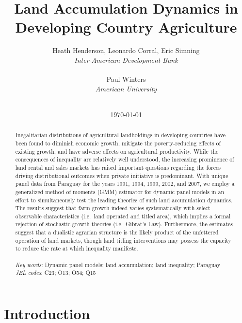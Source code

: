 \documentclass[english]{article}
\title{Land Accumulation Dynamics in Developing Country Agriculture}
\author{
Heath Henderson, Leonardo Corral, Eric Simning\\
\textit{Inter-American Development Bank} \\
\\
Paul Winters \\
\textit{American University}
\\ \\
}
\date{\today}
\begin{document}

\begin{titlepage}
\maketitle

\begin{abstract}
Inegalitarian distributions of agricultural landholdings in developing countries
have been found to diminish economic growth, mitigate the poverty-reducing
effects of existing growth, and have adverse effects on agricultural 
productivity.
While the consequences of inequality are relatively well understood, the 
increasing prominence of land rental and sales markets has raised 
important questions regarding the forces driving distributional outcomes 
when private initiative is predominant.
With unique panel data from Paraguay for the years 1991, 1994, 1999, 2002, 
and 2007, we employ a generalized method of moments (GMM) estimator 
for dynamic panel models in an effort to simultaneously test the leading 
theories of such land accumulation dynamics. 
The results suggest that farm growth indeed varies systematically with 
select observable characteristics (i.e.\ land operated and titled area), 
which implies a formal rejection of stochastic growth theories (i.e.\
Gibrat's Law). 
Furthermore, the estimates suggest that a dualistic agrarian structure is 
the likely product of the unfettered operation of land markets, though
land titling interventions may possess the capacity to reduce the rate at 
which inequality manifests. \\
\\
\textit{Key words}: Dynamic panel models; land accumulation; 
land inequality; Paraguay \\
\textit{JEL codes}:  C23; O13; O54; Q15
\end{abstract}
\thispagestyle{empty}
\end{titlepage}
\newpage


\doublespacing


\section{Introduction}
\label{sec: intro}
\end{document}

